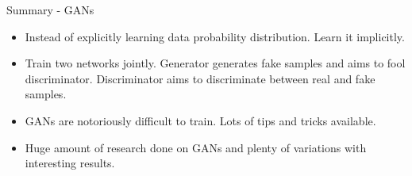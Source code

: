 \begin{frame}{Summary - GANs}
\begin{itemize}
    \item Instead of explicitly learning data probability distribution. Learn it implicitly.
    \item Train two networks jointly. Generator generates fake samples and aims to fool discriminator. Discriminator aims to discriminate between real and fake samples.
    \item GANs are notoriously difficult to train. Lots of tips and tricks available.
    \item Huge amount of research done on GANs and plenty of variations with interesting results.
\end{itemize}
\end{frame}